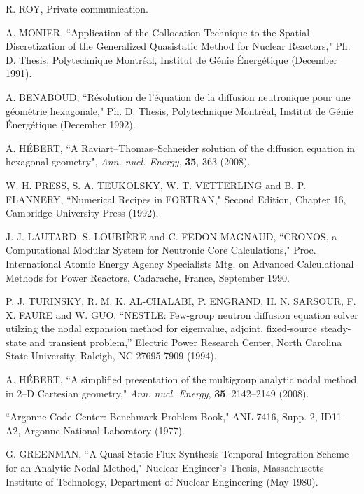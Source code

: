 \begin{thebibliography}{99}
R. ROY, Private communication.

A. MONIER, ``Application of the Collocation Technique to the Spatial Discretization of the Generalized Quasistatic Method for Nuclear Reactors," Ph. D. Thesis, Polytechnique Montr\'eal, Institut de G\'enie \'Energ\'etique (December 1991).

A. BENABOUD, ``R\'esolution de l'\'equation de la diffusion neutronique pour une g\'eom\'etrie hexagonale," Ph. D. Thesis, Polytechnique Montr\'eal, Institut de G\'enie \'Energ\'etique (December 1992).

A. H\'EBERT, ``A Raviart--Thomas--Schneider solution of the diffusion equation in hexagonal geometry", {\sl Ann. nucl. Energy},
{\bf 35}, 363 (2008).

W. H. PRESS, S. A. TEUKOLSKY, W. T. VETTERLING and B. P. FLANNERY, ``Numerical Recipes in FORTRAN," Second Edition, Chapter 16, Cambridge University Press (1992).

J. J. LAUTARD, S. LOUBI\`ERE and C. FEDON-MAGNAUD, ``CRONOS, a Computational Modular System for Neutronic Core Calculations," Proc. International Atomic Energy Agency Specialists Mtg. on Advanced Calculational Methods for Power Reactors, Cadarache, France, September 1990.

P. J. TURINSKY, R. M. K. AL-CHALABI, P. ENGRAND, H. N. SARSOUR, F. X. FAURE and  W. GUO, ``NESTLE: Few-group neutron diffusion equation solver utilzing the nodal expansion
method for eigenvalue, adjoint, fixed-source steady-state and transient problem,'' Electric Power Research Center, North Carolina State University, Raleigh, NC 27695-7909 (1994).

A. H\'EBERT, ``A simplified presentation of the multigroup analytic nodal method
in 2--D Cartesian geometry," {\sl Ann. nucl. Energy}, {\bf 35}, 2142--2149 (2008).

``Argonne Code Center: Benchmark Problem Book," ANL-7416, Supp. 2, ID11-A2, Argonne National Laboratory (1977).

G. GREENMAN, ``A Quasi-Static Flux Synthesis Temporal Integration Scheme for an Analytic Nodal Method," Nuclear Engineer's Thesis, Massachusetts Institute of Technology, Department of Nuclear Engineering (May 1980).

\end{thebibliography}

